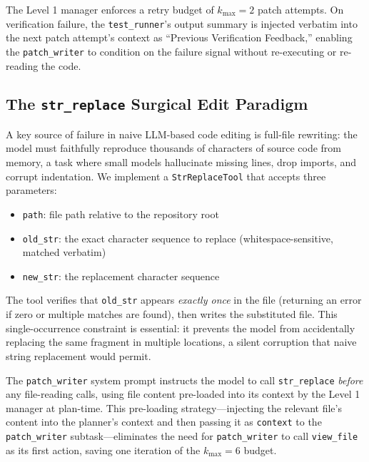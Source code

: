 The Level 1 manager enforces a retry budget of $k_{\max} = 2$ patch
attempts. On verification failure, the \texttt{test\_runner}'s output
summary is injected verbatim into the next patch attempt's context as
``Previous Verification Feedback,'' enabling the \texttt{patch\_writer} to
condition on the failure signal without re-executing or re-reading the code.

\subsection{The \texttt{str\_replace} Surgical Edit Paradigm}
\label{sec:arch:strreplce}

A key source of failure in naive LLM-based code editing is full-file
rewriting: the model must faithfully reproduce thousands of characters of
source code from memory, a task where small models hallucinate missing
lines, drop imports, and corrupt indentation. We implement a
\texttt{StrReplaceTool} that accepts three parameters:

\begin{itemize}
  \item \texttt{path}: file path relative to the repository root
  \item \texttt{old\_str}: the exact character sequence to replace
    (whitespace-sensitive, matched verbatim)
  \item \texttt{new\_str}: the replacement character sequence
\end{itemize}

\noindent The tool verifies that \texttt{old\_str} appears \emph{exactly
once} in the file (returning an error if zero or multiple matches are found),
then writes the substituted file. This single-occurrence constraint is
essential: it prevents the model from accidentally replacing the same
fragment in multiple locations, a silent corruption that naive string
replacement would permit.

The \texttt{patch\_writer} system prompt instructs the model to call
\texttt{str\_replace} \emph{before} any file-reading calls, using file
content pre-loaded into its context by the Level 1 manager at plan-time.
This pre-loading strategy---injecting the relevant file's content into the
planner's context and then passing it as \texttt{context} to the
\texttt{patch\_writer} subtask---eliminates the need for
\texttt{patch\_writer} to call \texttt{view\_file} as its first action,
saving one iteration of the $k_{\max} = 6$ budget.

